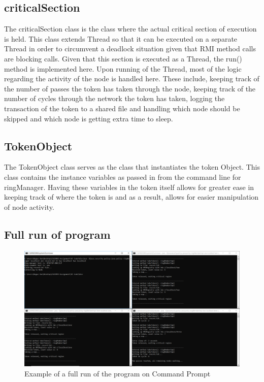 \documentclass[11pt, a4paper]{article}
\begin{document}
\subsection{criticalSection}

The criticalSection class is the class where the actual critical section of execution is held. This class extends Thread so that it can be executed on a separate Thread in order to circumvent a deadlock situation given that RMI method calls are blocking calls. Given that this section is executed as a Thread, the run() method is implemented here. Upon running of the Thread, most of the logic regarding the activity of the node is handled here. These include, keeping track of the number of passes the token has taken through the node, keeping track of the number of cycles through the network the token has taken, logging the transaction of the token to a shared file and handling which node should be skipped and which node is getting extra time to sleep. 

\subsection{TokenObject}

The TokenObject class serves as the class that instantiates the token Object. This class contains the instance variables as passed in from the command line for ringManager. Having these variables in the token itself allows for greater ease in keeping track of where the token is and as a result, allows for easier manipulation of node activity.

\subsection{Full run of program}
\begin{figure}[!h]
\centering
\includegraphics[scale=0.4]{full_run}
\caption{Example of a full run of the program on Command Prompt}
\end{figure}
\end{document}

